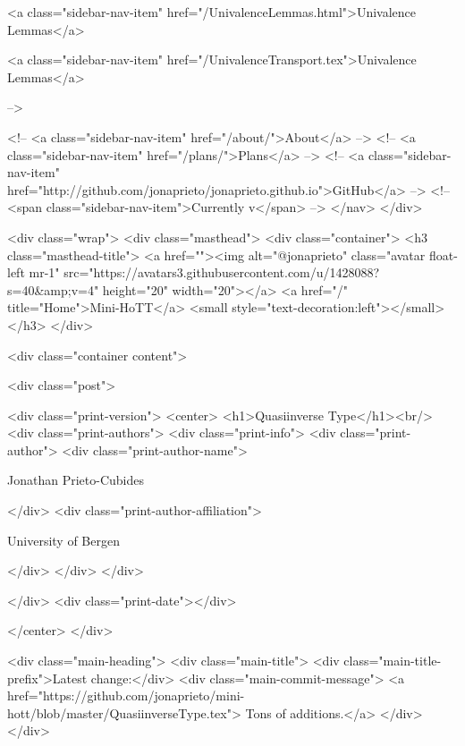       
    
      
        
          <a class="sidebar-nav-item" href="/UnivalenceLemmas.html">Univalence Lemmas</a>
        
      
    
      
        
          <a class="sidebar-nav-item" href="/UnivalenceTransport.tex">Univalence Lemmas</a>
        
      
     -->

    <!-- <a class="sidebar-nav-item" href="/about/">About</a> -->
    <!-- <a class="sidebar-nav-item" href="/plans/">Plans</a> -->
    <!-- <a class="sidebar-nav-item" href="http://github.com/jonaprieto/jonaprieto.github.io">GitHub</a> -->
    <!-- <span class="sidebar-nav-item">Currently v</span> -->
  </nav>
</div>

    <div class="wrap">
      <div class="masthead">
        <div class="container">
          <h3 class="masthead-title">
            <a href=""><img alt="@jonaprieto" class="avatar float-left mr-1" src="https://avatars3.githubusercontent.com/u/1428088?s=40&amp;v=4" height="20" width="20"></a>
            <a href="/" title="Home">Mini-HoTT</a>
            <small style="text-decoration:left"></small>
          </h3>
        </div>
      
      <div class="container content">
        







<div class="post">

  <div class="print-version">
    <center>
      <h1>Quasiinverse Type</h1><br/>
        <div class="print-authors">
          <div class="print-info">
            <div class="print-author">
              <div class="print-author-name">
                
                  Jonathan Prieto-Cubides
                
              </div>
              <div class="print-author-affiliation">
                
                  University of Bergen
                
                </div>
            </div>
          </div>
          
          
        </div>
        <div class="print-date"></div>
        
        
    </center>
  </div>

  
  <div class="main-heading">
    <div class="main-title">
      <div class="main-title-prefix">Latest change:</div>
      <div class="main-commit-message">
            <a href="https://github.com/jonaprieto/mini-hott/blob/master/QuasiinverseType.tex">
              Tons of additions.</a>
      </div>
    </div>

